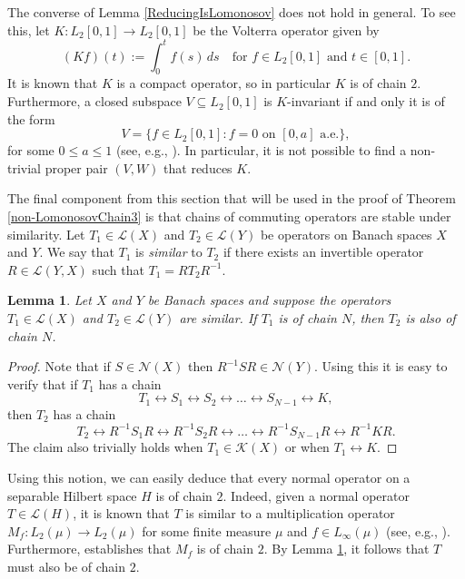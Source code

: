 \documentclass[a4paper,12pt]{article}
\newtheorem{lemma}[thm]{Lemma}
\theoremstyle{definition}
\numberwithin{equation}{section}
\numberwithin{thm}{section}
\begin{document}
The converse of Lemma \ref{ReducingIsLomonosov} does not hold in general. To see this, let $K: L_2[0,1] \rightarrow L_2[0,1]$ be the Volterra operator given by
\begin{equation}
\label{exampleVolterra}
(Kf)(t) := \int_0^t f(s)\,ds \quad \text{for } f\in L_2[0,1] \text{ and } t\in [0,1].
\end{equation}
It is known that $K$ is a compact operator, so in particular $K$ is of chain $2$. Furthermore, a closed subspace $V \subseteq L_2[0,1]$ is $K$-invariant if and only it is of the form
\begin{equation}
\label{exampleVolterra_subspaces}
V = \{f\in L_2[0,1]: f=0\text{ on } [0,a] \text{ a.e.}\},
\end{equation}
for some $0\leq a\leq 1$ (see, e.g., \cite[Theorem 7.4.1]{garcia2023operator}). In particular, it is not possible to find a non-trivial proper pair $(V,W)$ that reduces $K$.

The final component from this section that will be used in the proof of Theorem \ref{non-LomonosovChain3} is that chains of commuting operators are stable under similarity. Let $T_1\in \mathcal{L}(X)$ and $T_2\in \mathcal{L}(Y)$ be operators on Banach spaces $X$ and $Y$. We say that $T_1$ is \textit{similar} to $T_2$ if there exists an invertible operator $R\in \mathcal{L}(Y,X)$ such that $T_1=RT_2R^{-1}$. 

\begin{lemma}
\label{similarChainPreserved}
Let $X$ and $Y$ be Banach spaces and suppose the operators $T_1\in \mathcal{L}(X)$ and $T_2\in \mathcal{L}(Y)$ are similar. If $T_1$ is of chain $N$, then $T_2$ is also of chain $N$.
\end{lemma}
\begin{proof}
Note that if $S \in \mathcal{N}(X)$ then $R^{-1}SR \in \mathcal{N}(Y)$. Using this it is easy to verify that if $T_1$ has a chain
$$T_1 \leftrightarrow S_1 \leftrightarrow S_2 \leftrightarrow \dots\leftrightarrow S_{N-1} \leftrightarrow K,$$
then $T_2$ has a chain
$$T_2 \leftrightarrow R^{-1}S_1R \leftrightarrow R^{-1}S_2R \leftrightarrow \dots \leftrightarrow R^{-1}S_{N-1}R \leftrightarrow R^{-1}KR.$$
The claim also trivially holds when $T_1\in \mathcal{K}(X)$ or when $T_1 \leftrightarrow K$. 
\end{proof}

Using this notion, we can easily deduce that every normal operator on a separable Hilbert space $H$ is of chain $2$. Indeed, given a normal operator $T\in \mathcal{L}(H)$, it is known that $T$ is similar to a multiplication operator $M_f : L_2(\mu) \rightarrow L_2(\mu)$ for some finite measure $\mu$ and $f\in L_\infty(\mu)$ (see, e.g., \cite[Theorem 1.6]{InvariantSubspaces}). Furthermore, \cite[Theorem 2.8]{AbramovicMultiplication} establishes that $M_f$ is of chain $2$. By Lemma \ref{similarChainPreserved}, it follows that $T$ must also be of chain $2$.
\end{document}
